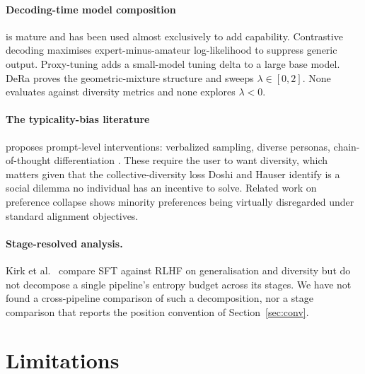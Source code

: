 \documentclass[11pt]{article}
\begin{document}
\paragraph{Decoding-time model composition} is mature and has been used almost
exclusively to add capability. Contrastive decoding \cite{li2023} maximises
expert-minus-amateur log-likelihood to suppress generic output. Proxy-tuning
\cite{liu2024proxy} adds a small-model tuning delta to a large base model. DeRa
\cite{liu2024dera} proves the geometric-mixture structure and sweeps
$\lambda \in [0, 2]$. None evaluates against diversity metrics and none explores
$\lambda < 0$.

\paragraph{The typicality-bias literature} proposes prompt-level interventions:
verbalized sampling, diverse personas, chain-of-thought differentiation
\cite{zhang2025}. These require the user to want diversity, which matters given that
the collective-diversity loss Doshi and Hauser \cite{doshi2024} identify is a social
dilemma no individual has an incentive to solve. Related work on preference collapse
\cite{xiao2024} shows minority preferences being virtually disregarded under
standard alignment objectives.

\paragraph{Stage-resolved analysis.} Kirk et al.\ \cite{kirk2024} compare SFT against
RLHF on generalisation and diversity but do not decompose a single pipeline's
entropy budget across its stages. We have not found a cross-pipeline comparison of
such a decomposition, nor a stage comparison that reports the position convention of
Section~\ref{sec:conv}.

\section{Limitations}
\label{sec:limits}
\end{document}
